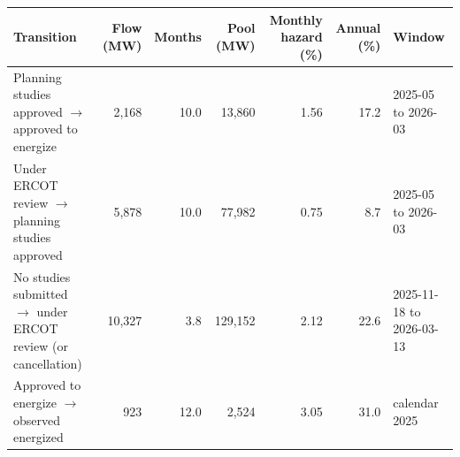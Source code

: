 \begin{tabular}{lrrrrrl}
\toprule
Transition & Flow (MW) & Months & Pool (MW) & Monthly hazard (\%) & Annual (\%) & Window \\
\midrule
Planning studies approved $\rightarrow$ approved to energize & 2,168 & 10.0 & 13,860 & 1.56 & 17.2 & 2025-05 to 2026-03 \\
Under ERCOT review $\rightarrow$ planning studies approved & 5,878 & 10.0 & 77,982 & 0.75 & 8.7 & 2025-05 to 2026-03 \\
No studies submitted $\rightarrow$ under ERCOT review (or cancellation) & 10,327 & 3.8 & 129,152 & 2.12 & 22.6 & 2025-11-18 to 2026-03-13 \\
Approved to energize $\rightarrow$ observed energized & 923 & 12.0 & 2,524 & 3.05 & 31.0 & calendar 2025 \\
\bottomrule
\end{tabular}